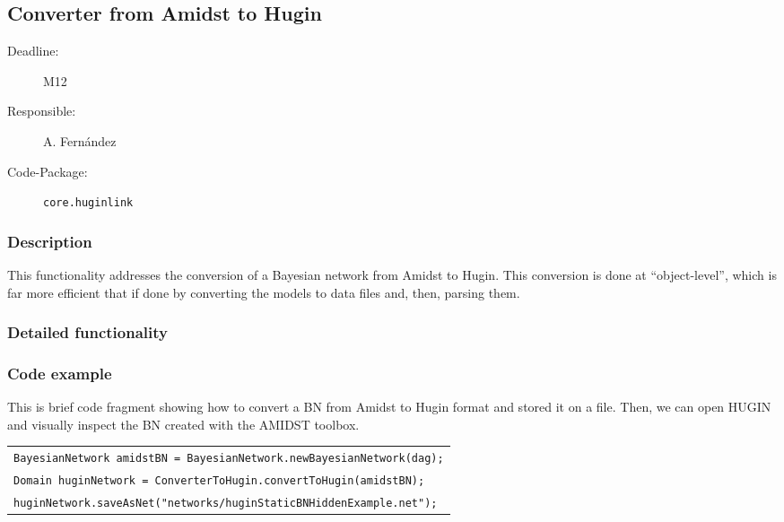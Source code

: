 \newpage
\subsection{Converter from Amidst to Hugin}
\label{ConverterFromAmidstToHugin}

\begin{description}
\item[Deadline:] M12
\item[Responsible:] A. Fern\'andez
\item[Code-Package:] \texttt{core.huginlink}
\end{description}
\subsubsection*{Description}

This functionality addresses the conversion of a Bayesian network from Amidst to Hugin. This conversion is done at ``object-level'', which is far more efficient that if done by converting the models to data files and, then, parsing them. 

\subsubsection*{Detailed functionality}

\vspace{1in}

\subsubsection*{Code example}

This is brief code fragment showing how to convert a BN from Amidst to Hugin format and stored it on a file. Then, we can open HUGIN and visually inspect the BN created with the AMIDST toolbox. 

\begin{table}[H]
\begin{tabular}{l} \hline
\texttt{BayesianNetwork amidstBN = BayesianNetwork.newBayesianNetwork(dag);}\\
\texttt{Domain huginNetwork = ConverterToHugin.convertToHugin(amidstBN);}\\
\texttt{huginNetwork.saveAsNet("networks/huginStaticBNHiddenExample.net");}\\ \hline

\end{tabular}
\end{table} 